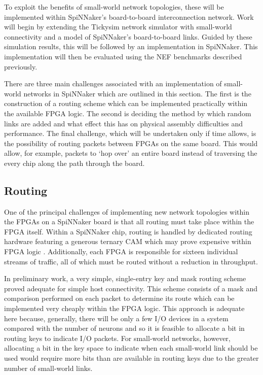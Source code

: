 		
		To exploit the benefits of small-world network topologies, these will be
		implemented within SpiNNaker's board-to-board interconnection network. Work
		will begin by extending the Tickysim network simulator with small-world
		connectivity and a model of SpiNNaker's board-to-board links. Guided by
		these simulation results, this will be followed by an implementation in
		SpiNNaker.  This implementation will then be evaluated using the NEF
		benchmarks described previously.
		
		There are three main challenges associated with an implementation of
		small-world networks in SpiNNaker which are outlined in this section. The
		first is the construction of a routing scheme which can be implemented
		practically within the available FPGA logic. The second is deciding the
		method by which random links are added and what effect this has on physical
		assembly difficulties and performance. The final challenge, which will be
		undertaken only if time allows, is the possibility of routing packets
		between FPGAs on the same board. This would allow, for example, packets to
		`hop over' an entire board instead of traversing the every chip along the
		path through the board.
		
		\subsection{Routing}
			
			One of the principal challenges of implementing new network topologies
			within the FPGAs on a SpiNNaker board is that all routing must take place
			within the FPGA itself. Within a SpiNNaker chip, routing is handled by
			dedicated routing hardware featuring a generous ternary CAM which may
			prove expensive within FPGA logic \cite{locke11}. Additionally, each FPGA
			is responsible for sixteen individual streams of traffic, all of which
			must be routed without a reduction in throughput.
			
			In preliminary work, a very simple, single-entry key and mask routing
			scheme proved adequate for simple host connectivity.  This scheme consists
			of a mask and comparison performed on each packet to determine its route
			which can be implemented very cheaply within the FPGA logic.  This
			approach is adequate here because, generally, there will be only a few I/O
			devices in a system compared with the number of neurons and so it is
			feasible to allocate a bit in routing keys to indicate I/O packets.  For
			small-world networks, however, allocating a bit in the key space to
			indicate when each small-world link should be used would require more bits
			than are available in routing keys due to the greater number of
			small-world links.
			
